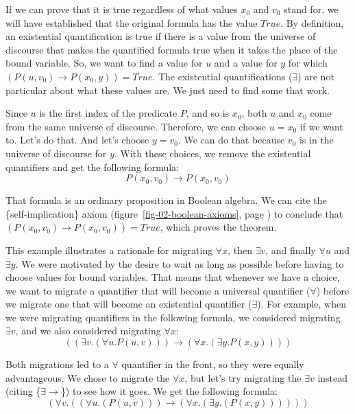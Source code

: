 {{If we can prove that it is true regardless of what values
$x_0$ and $v_0$ stand for, we will have established that the
original formula has the value $True$.
By definition, an existential quantification is true if
there is a value from the universe of discourse that
makes the quantified formula true when it takes the place of
the bound variable.
So, we want to find a value for $u$ and a value for $y$
for which $(P(u, v_0) \rightarrow P(x_0, y)) = True$.
The existential quantifications ($\exists$) are not particular about
what these values are. We just need to find some that work.

Since $u$ is the first index of the predicate $P$,
and so is $x_0$, both $u$ and $x_0$ come from the same universe of discourse.
Therefore, we can choose $u = x_0$ if we want to. Let's do that.
And let's choose $y = v_0$.
We can do that because $v_0$
is in the universe of discourse for $y$.
With these choices, we remove the existential quantifiers and
get the following formula:
$$P(x_0, v_0) \rightarrow P(x_0, v_0)$$

That formula is an ordinary proposition in Boolean algebra.
We can cite the \{self-implication\} axiom
(figure~\ref{fig-02-boolean-axioms}, page \pageref{fig-02-boolean-axioms})
to conclude that $(P(x_0, v_0) \rightarrow P(x_0, v_0)) = True$,
which proves the theorem.

This example illustrates a rationale for migrating
$\forall x$, then $\exists v$, and finally $\forall u$ and $\exists y$.
We were motivated by the desire to wait as long as possible before having to
choose values for bound variables.
That means that whenever we have a choice, we want to migrate a quantifier
that will become a universal quantifier ($\forall$) before we migrate
one that will become an existential quantifier ($\exists$).
For example, when we were migrating quantifiers in the following formula,
we considered migrating $\exists v$,
and we also considered migrating $\forall x$:
$$((\exists v.(\forall u.P(u, v))) \rightarrow (\forall x.(\exists y.P(x, y))))$$

Both migrations led to a $\forall$ quantifier in the front,
so they were equally advantageous.
We chose to migrate the $\forall x$, but let's try migrating
the $\exists v$ instead (citing \{${\exists}{\rightarrow}$\}) to see how it goes.
We get the following formula:
$$(\forall v.((\forall u.(P(u, v))) \rightarrow (\forall x.(\exists y.(P(x, y))))))$$

}}
